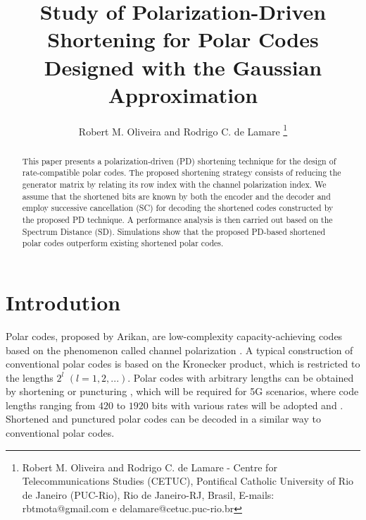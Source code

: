 \documentclass[10pt,twocolumn]{IEEEtran}
\begin{document}
\title{Study of Polarization-Driven Shortening for Polar Codes Designed with the Gaussian Approximation}

\author{Robert M. Oliveira and Rodrigo C. de Lamare
\thanks{Robert M. Oliveira and Rodrigo C. de Lamare - Centre for Telecommunications
Studies (CETUC), Pontifical Catholic University of Rio de Janeiro
(PUC-Rio), Rio de Janeiro-RJ, Brasil, E-mails: rbtmota@gmail.com e
delamare@cetuc.puc-rio.br} }

\maketitle


\begin{abstract}
This paper presents a polarization-driven (PD) shortening technique
for the design of rate-compatible polar codes. The proposed
shortening strategy consists of reducing the generator matrix by
relating its row index with the channel polarization index. We
assume that the shortened bits are known by both the encoder and the
decoder and employ successive cancellation (SC) for decoding the
shortened codes constructed by the proposed PD technique. A
performance analysis is then carried out based on the Spectrum
Distance (SD). Simulations show that the proposed PD-based shortened
polar codes outperform existing shortened polar codes.
\end{abstract}


\section{Introdution}

Polar codes, proposed by Arikan, are low-complexity
capacity-achieving codes based on the phenomenon called channel
polarization \cite{Arikan}. A typical construction of conventional polar codes
is based on the Kronecker product, which is restricted to the
lengths $2^l$ $(l = 1,2,...)$. Polar codes with arbitrary lengths
can be obtained by shortening or puncturing \cite{Bioglio}, which will be
required for 5G scenarios, where code lengths ranging from $420$ to
$1920$ bits with various rates will be adopted \cite{Osseiran} and \cite{Ferreira}.
Shortened and punctured polar codes  can be decoded in a similar way
to conventional polar codes.
\end{document}

